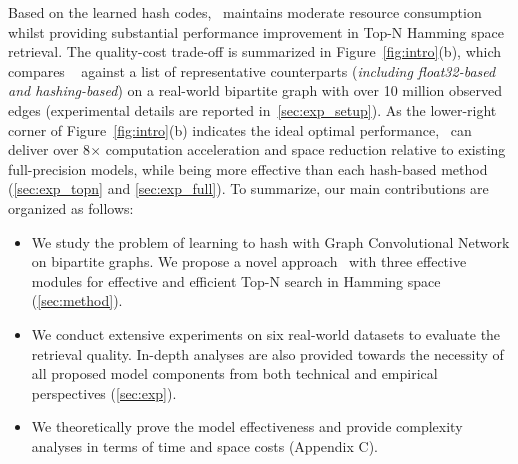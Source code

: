 Based on the learned hash codes, \model~maintains moderate resource consumption whilst providing substantial performance improvement in Top-N Hamming space retrieval.
The quality-cost trade-off is summarized in Figure~\ref{fig:intro}(b), which compares \model~ against a list of representative counterparts (\textit{including float32-based and hashing-based}) on a real-world bipartite graph with over 10 million observed edges (experimental details are reported in~\cref{sec:exp_setup}).
As the lower-right corner of Figure~\ref{fig:intro}(b) indicates the ideal optimal performance, \model~can deliver over 8$\times$ computation acceleration and space reduction relative to existing full-precision models, while being more effective than each hash-based method (\cref{sec:exp_topn} and \cref{sec:exp_full}).
To summarize, our main contributions are organized as follows:
\begin{itemize}[leftmargin=*]
\item 
We study the problem of learning to hash with Graph Convolutional Network on bipartite graphs.
We propose a novel approach \model~with three effective modules for effective and efficient Top-N search in Hamming space (\cref{sec:method}).

\item We conduct extensive experiments on six real-world datasets to evaluate the retrieval quality.
In-depth analyses are also provided towards the necessity of all proposed model components from both technical and empirical perspectives (\cref{sec:exp}).
 


\item We theoretically prove the model effectiveness and provide complexity analyses in terms of time and space costs (Appendix C).
\end{itemize}


